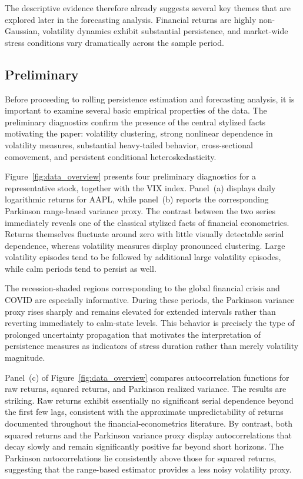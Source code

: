 \documentclass[unnumsec,webpdf,contemporary,large]{oup-authoring-template}%
\theoremstyle{thmstyleone}%
\theoremstyle{thmstyletwo}%
\theoremstyle{thmstylethree}%
\begin{document}
The descriptive evidence therefore already suggests several key themes that
are explored later in the forecasting analysis. Financial returns are
highly non-Gaussian, volatility dynamics exhibit substantial persistence,
and market-wide stress conditions vary dramatically across the sample
period.



\subsection{Preliminary  }

Before proceeding to rolling persistence estimation and forecasting
analysis, it is important to examine several basic empirical properties of
the data. The preliminary diagnostics confirm the presence of the central
stylized facts motivating the paper: volatility clustering, strong
nonlinear dependence in volatility measures, substantial heavy-tailed
behavior, cross-sectional comovement, and persistent conditional
heteroskedasticity.

Figure~\ref{fig:data_overview} presents four preliminary diagnostics for a
representative stock, together with the VIX index. Panel~(a) displays
daily logarithmic returns for AAPL, while panel~(b) reports the
corresponding Parkinson range-based variance proxy. The contrast between
the two series immediately reveals one of the classical stylized facts of
financial econometrics. Returns themselves fluctuate around zero with
little visually detectable serial dependence, whereas volatility measures
display pronounced clustering. Large volatility episodes tend to be
followed by additional large volatility episodes, while calm periods tend
to persist as well.

The recession-shaded regions corresponding to the global financial crisis
and COVID are especially informative. During these periods, the Parkinson
variance proxy rises sharply and remains elevated for extended intervals
rather than reverting immediately to calm-state levels. This behavior is
precisely the type of prolonged uncertainty propagation that motivates the
interpretation of persistence measures as indicators of stress duration
rather than merely volatility magnitude.

Panel~(c) of Figure~\ref{fig:data_overview} compares autocorrelation
functions for raw returns, squared returns, and Parkinson realized
variance. The results are striking. Raw returns exhibit essentially no
significant serial dependence beyond the first few lags, consistent with
the approximate unpredictability of returns documented throughout the
financial-econometrics literature. By contrast, both squared returns and
the Parkinson variance proxy display autocorrelations that decay slowly and
remain significantly positive far beyond short horizons. The Parkinson
autocorrelations lie consistently above those for squared returns,
suggesting that the range-based estimator provides a less noisy volatility
proxy.
\end{document}
